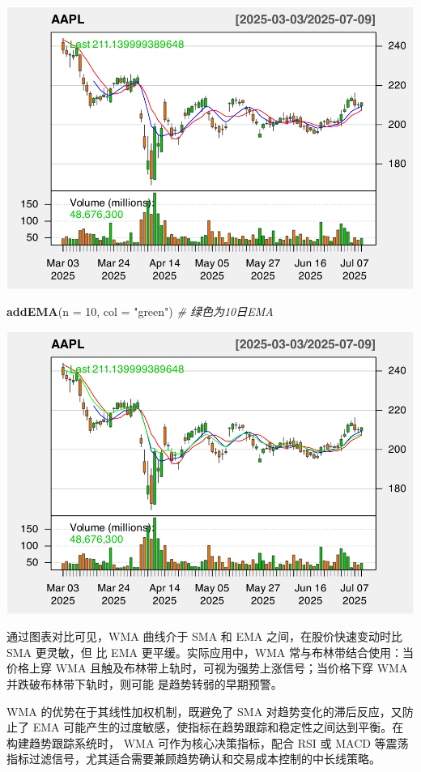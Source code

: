 \documentclass[]{ctexbook}
\newenvironment{Shaded}{\begin{snugshade}}{\end{snugshade}}
\newcommand{\AttributeTok}[1]{\textcolor[rgb]{0.13,0.29,0.53}{#1}}
\newcommand{\CommentTok}[1]{\textcolor[rgb]{0.56,0.35,0.01}{\textit{#1}}}
\newcommand{\DecValTok}[1]{\textcolor[rgb]{0.00,0.00,0.81}{#1}}
\newcommand{\FunctionTok}[1]{\textcolor[rgb]{0.13,0.29,0.53}{\textbf{#1}}}
\newcommand{\NormalTok}[1]{#1}
\newcommand{\StringTok}[1]{\textcolor[rgb]{0.31,0.60,0.02}{#1}}
\begin{document}
\includegraphics[width=0.9\linewidth]{quantmod_files/figure-latex/wma-3}

\begin{Shaded}
\begin{Highlighting}[]
\FunctionTok{addEMA}\NormalTok{(}\AttributeTok{n =} \DecValTok{10}\NormalTok{, }\AttributeTok{col =} \StringTok{"green"}\NormalTok{)   }\CommentTok{\# 绿色为10日EMA}
\end{Highlighting}
\end{Shaded}

\includegraphics[width=0.9\linewidth]{quantmod_files/figure-latex/wma-4}

通过图表对比可见，WMA 曲线介于 SMA 和 EMA 之间，在股价快速变动时比 SMA 更灵敏，但
比 EMA 更平缓。实际应用中，WMA 常与布林带结合使用：当价格上穿 WMA 且触及布林带上轨时，可视为强势上涨信号；当价格下穿 WMA 并跌破布林带下轨时，则可能
是趋势转弱的早期预警。

WMA 的优势在于其线性加权机制，既避免了 SMA 对趋势变化的滞后反应，又防止了 EMA 可能产生的过度敏感，使指标在趋势跟踪和稳定性之间达到平衡。在构建趋势跟踪系统时，
WMA 可作为核心决策指标，配合 RSI 或 MACD 等震荡指标过滤信号，尤其适合需要兼顾趋势确认和交易成本控制的中长线策略。
\end{document}
